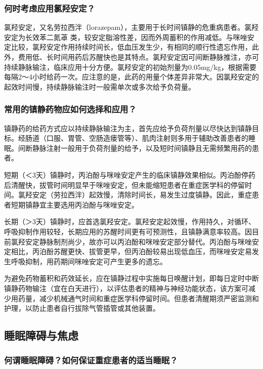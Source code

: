 \subsubsection{何时考虑应用氯羟安定？}

氯羟安定，又名劳拉西泮（lorazepam），主要用于长时间镇静的危重病患者。氯羟安定为长效苯二氮䓬
类，较安定脂溶性差，因而外周蓄积的作用减低。与咪唑安定比较，氯羟安定作用持续时间长，低血压发生少，有相同的顺行性遗忘作用，此外，费用低、长时间用药后苏醒快也是其特点。氯羟安定因可间断静脉推注，亦可持续静脉输注，临床应用十分方便。氯羟安定的初始剂量为0.05mg/kg，根据需要每隔2～4小时给药一次。应注意的是，此药的用量个体差异非常大。因氯羟安定的起效时间慢，持续静脉输注时一般需单次或多次给予负荷量。

\subsubsection{常用的镇静药物应如何选择和应用？}

镇静药的给药方式应以持续静脉输注为主，首先应给予负荷剂量以尽快达到镇静目标。经肠道（口服、胃管、空肠造瘘管等）、肌肉注射则多用于辅助改善患者的睡眠。间断静脉注射一般用于负荷剂量的给予，以及短时间镇静且无需频繁用药的患者。

短期（＜3天）镇静时，丙泊酚与咪唑安定产生的临床镇静效果相似。丙泊酚停药后清醒快，拔管时间明显早于咪唑安定，但未能缩短患者在重症医学科的停留时间。氯羟安定（劳拉西泮）起效慢，清除时间长，易发生过度镇静。因此，重症患者短期镇静宜主要选用丙泊酚与咪唑安定。

长期（＞3天）镇静时，应首选氯羟安定。氯羟安定起效慢，作用持久，对循环、呼吸抑制作用较轻，长期应用的苏醒时间更有可预测性，且镇静满意率较高。因目前氯羟安定静脉制剂尚少，故亦可以丙泊酚和咪唑安定部分替代。丙泊酚与咪唑安定相比，丙泊酚苏醒更快、拔管更早，但丙泊酚较易出现低血压，而咪唑安定易发生呼吸抑制，用药期间咪唑安定可产生更多的遗忘。

为避免药物蓄积和药效延长，应在镇静过程中实施每日唤醒计划，即每日定时中断镇静药物输注（宜在白天进行），以评估患者的精神与神经功能状态，该方案可减少用药量，减少机械通气时间和重症医学科停留时间。但患者清醒期须严密监测和护理，以防止患者自行拔除气管插管或其他装置。

\subsection{睡眠障碍与焦虑}

\subsubsection{何谓睡眠障碍？如何保证重症患者的适当睡眠？}


